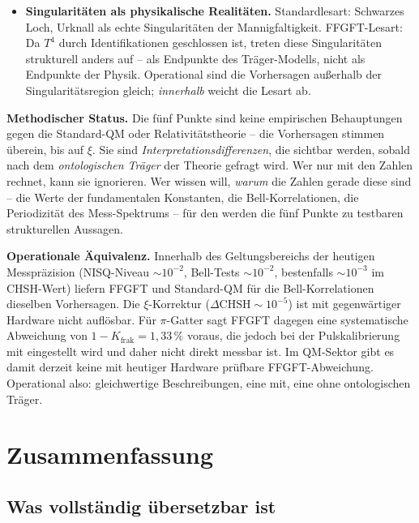 \begin{itemize}[leftmargin=2em,itemsep=4pt,topsep=4pt]
  \item \textbf{Singularit\"aten als physikalische Realit\"aten.}
        Standardlesart: Schwarzes Loch, Urknall als echte
        Singularit\"aten der Mannigfaltigkeit. FFGFT-Lesart: Da $T^4$
        durch Identifikationen geschlossen ist, treten diese
        Singularit\"aten strukturell anders auf -- als
        Endpunkte des Tr\"ager-Modells, nicht als Endpunkte der
        Physik. Operational sind die Vorhersagen au\ss erhalb der
        Singularit\"atsregion gleich; \emph{innerhalb} weicht die
        Lesart ab.
\end{itemize}

\textbf{Methodischer Status.} Die f\"unf Punkte sind keine empirischen
Behauptungen gegen die Standard-QM oder Relativit\"atstheorie -- die
Vorhersagen stimmen \"uberein, bis auf $\xi$. Sie sind
\emph{Interpretationsdifferenzen}, die sichtbar werden, sobald nach
dem \emph{ontologischen Tr\"ager} der Theorie gefragt wird. Wer nur
mit den Zahlen rechnet, kann sie ignorieren. Wer wissen will,
\emph{warum} die Zahlen gerade diese sind -- die Werte der
fundamentalen Konstanten, die Bell-Korrelationen, die Periodizit\"at
des Mess-Spektrums -- f\"ur den werden die f\"unf Punkte zu
testbaren strukturellen Aussagen.

\textbf{Operationale \"Aquivalenz.} Innerhalb des Geltungsbereichs der
heutigen Messpr\"azision (NISQ-Niveau $\sim 10^{-2}$, Bell-Tests
$\sim 10^{-2}$, bestenfalls $\sim 10^{-3}$ im CHSH-Wert) liefern FFGFT
und Standard-QM für die Bell-Korrelationen dieselben Vorhersagen. Die $\xi$-Korrektur
($\Delta\text{CHSH} \sim 10^{-5}$) ist mit gegenw\"artiger Hardware nicht aufl\"osbar.
Für $\pi$-Gatter sagt FFGFT dagegen eine systematische
Abweichung von $1 - K_{\text{frak}} = 1{,}33\,\%$ voraus, die jedoch bei der
Pulskalibrierung mit eingestellt wird und daher nicht direkt messbar ist.
Im QM-Sektor gibt es damit derzeit keine mit heutiger Hardware prüfbare
FFGFT-Abweichung. Operational also:
gleichwertige Beschreibungen, eine
mit, eine ohne ontologischen Tr\"ager.

\section{Zusammenfassung}

\subsection*{Was vollständig übersetzbar ist}

